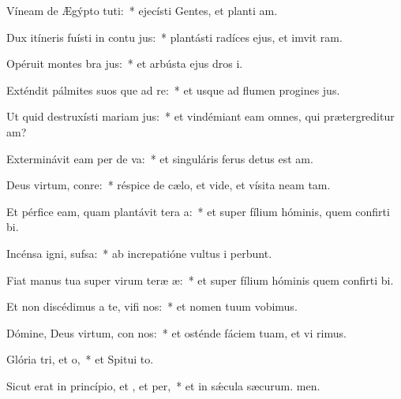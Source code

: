 \item Víneam de Ægýpto tuti:~* ejecísti Gentes, et planti am.
\item Dux itíneris fuísti in contu jus:~* plantásti radíces ejus, et imvit ram.
\item Opéruit montes bra jus:~* et arbústa ejus dros i.
\item Exténdit pálmites suos que ad re:~* et usque ad flumen progines jus.
\item Ut quid destruxísti mariam jus:~* et vindémiant eam omnes, qui prætergreditur am?
\item Exterminávit eam per de va:~* et singuláris ferus detus est am.
\item Deus virtum, conre:~* réspice de cælo, et vide, et vísita neam tam.
\item Et pérfice eam, quam plantávit tera a:~* et super fílium hóminis, quem confirti bi.
\item Incénsa igni,  sufsa:~* ab increpatióne vultus i perbunt.
\item Fiat manus tua super virum teræ æ:~* et super fílium hóminis quem confirti bi.
\item Et non discédimus a te, vifi nos:~* et nomen tuum vobimus.
\item Dómine, Deus virtum, con nos:~* et osténde fáciem tuam, et vi rimus.
\item Glória tri, et o,~* et Spitui to.
\item Sicut erat in princípio, et , et per,~* et in sǽcula sæcurum. men.
